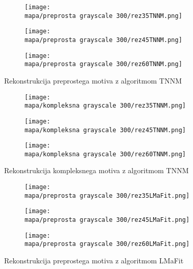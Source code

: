 \begin{figure}
    \begin{subfigure}{0.325\linewidth}
        \texttt{[image: \\mapa/preprosta grayscale 300/rez35TNNM.png]}
    \end{subfigure}
    \hfill
    \begin{subfigure}{0.325\linewidth}
        \texttt{[image: \\mapa/preprosta grayscale 300/rez45TNNM.png]}
    \end{subfigure}
    \hfill
    \begin{subfigure}{0.325\linewidth}
        \texttt{[image: \\mapa/preprosta grayscale 300/rez60TNNM.png]}
    \end{subfigure}
    \caption{Rekonstrukcija preprostega motiva z algoritmom TNNM}
\end{figure}

\begin{figure}
    \begin{subfigure}{0.325\linewidth}
        \texttt{[image: \\mapa/kompleksna grayscale 300/rez35TNNM.png]}
    \end{subfigure}
    \hfill
    \begin{subfigure}{0.325\linewidth}
        \texttt{[image: \\mapa/kompleksna grayscale 300/rez45TNNM.png]}
    \end{subfigure}
    \hfill
    \begin{subfigure}{0.325\linewidth}
        \texttt{[image: \\mapa/kompleksna grayscale 300/rez60TNNM.png]}
    \end{subfigure}
    \caption{Rekonstrukcija kompleksnega motiva z algoritmom TNNM}
\end{figure}

\begin{figure}
    \begin{subfigure}{0.325\linewidth}
        \texttt{[image: \\mapa/preprosta grayscale 300/rez35LMaFit.png]}
    \end{subfigure}
    \hfill
    \begin{subfigure}{0.325\linewidth}
        \texttt{[image: \\mapa/preprosta grayscale 300/rez45LMaFit.png]}
    \end{subfigure}
    \hfill
    \begin{subfigure}{0.325\linewidth}
        \texttt{[image: \\mapa/preprosta grayscale 300/rez60LMaFit.png]}
    \end{subfigure}
    \caption{Rekonstrukcija preprostega motiva z algoritmom LMaFit}
\end{figure}

